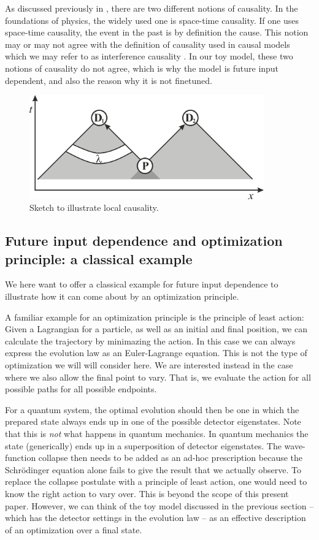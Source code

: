 \documentclass[11pt,twoside,A4]{article}
\begin{document}
As discussed previously in \cite{otherpaper}, there are two different notions of causality. In the foundations of physics, the widely used one is space-time causality. If one uses space-time causality, the event in the past is by definition the cause. This notion may or may not agree with the definition of causality used in causal models which we may refer to as interference causality \cite{Spirtes,Pearl}. In our toy model, these two notions of causality do not agree, which is why the model is future input dependent, and also the reason why it is not finetuned.  


\begin{figure}[h]
\centering
\includegraphics[width=0.9\textwidth]{bell.png}
\caption{Sketch to illustrate local causality.}
\label{bell}
\end{figure}

\subsection{Future input dependence and optimization principle: a classical example}

We here want to offer a classical example for future input dependence to illustrate how it can come about by an optimization principle. 

A familiar example for an optimization principle is the principle of least action: Given a Lagrangian for a particle, as well as an initial and final position, we can calculate the trajectory by minimazing the action.  In this case we can always express the evolution law as an Euler-Lagrange equation.
This is not the type of optimization we will will consider here. We are interested instead in the case where we also allow the final point to vary. That is, we evaluate the action for all possible paths for all possible endpoints. 

For a quantum system, the optimal evolution should then be one in which the prepared state always ends up in one of the possible detector eigenstates. Note that this is {\sl not} what happens in quantum mechanics. In quantum mechanics the state (generically) ends up in a superposition of detector eigenstates. The wave-function collapse then needs to be added as an ad-hoc prescription because the Schr\"odinger equation alone fails to give the result that we actually observe. To replace the collapse postulate with a principle of least action, one would need to know the right action to vary over. This is beyond the scope of this present paper. However, we can think of the toy model discussed in the previous section -- which has the detector settings in the evolution law -- as an effective description of an optimization over a final state. 
\end{document}
